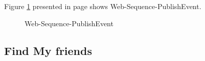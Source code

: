 \documentclass[12pt,a4paper,class,twoside,openany]{report}
\begin{document}
{Figure \ref{fg:4-4} presented in page \pageref{fg:4-4} shows Web-Sequence-PublishEvent.
\begin{figure}
\begin{center}
\caption{Web-Sequence-PublishEvent}
\label{fg:4-4}
\end{center}
\end{figure}
\subsection{Find My friends}
}
\end{document}
